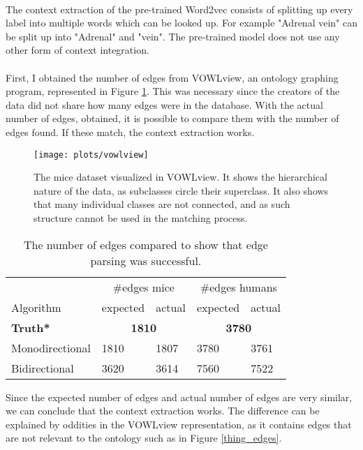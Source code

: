 \documentclass{article}
\begin{document}
  \paragraph{}
  The context extraction of the pre-trained Word2vec consists of splitting up every label into multiple words which can be looked up. For example "Adrenal vein" can be split up into "Adrenal" and "vein".
  The pre-trained model does not use any other form of context integration.
  \paragraph{}
  First, I obtained the number of edges from VOWLview\cite{vowlview}, an ontology graphing program, represented in Figure \ref{vowlfig}. This was necessary since the creators of the data did not share how many edges were in the database. With the actual number of edges, obtained, it is possible to compare them with the number of edges found. If these match, the context extraction works.
  
  \begin{figure}[H]
  \centering
  \texttt{[image: plots/vowlview]}
  \caption[VOWLview of mice dataset]{The mice dataset visualized in VOWLview. It shows the hierarchical nature of the data, as subclasses circle their superclass. It also shows that many individual classes are not connected, and as such structure cannot be used in the matching process.}
  \label{vowlfig}
  \end{figure}
  
  \begin{table}[H]
  \centering
  \caption[Edge comparison]{The number of edges compared to show that edge parsing was successful.}
  \label{edgecounts}
  \begin{tabular}{l|ll|ll}  
  & \multicolumn{2}{c}{\#edges mice} & \multicolumn{2}{c|}{\#edges humans}\\
  Algorithm & expected & actual & expected & actual\\
  \hline
  \textbf{Truth*} & \multicolumn{2}{c|}{\textbf{1810}} & \multicolumn{2}{c}{\textbf{3780}} \\
  Monodirectional & 1810 & 1807 & 3780 & 3761\\
  Bidirectional & 3620 & 3614 & 7560 & 7522\\
  \end{tabular}
  \end{table}

  Since the expected number of edges and actual number of edges are very similar, we can conclude that the context extraction works. The difference can be explained by oddities in the VOWLview representation, as it contains edges that are not relevant to the ontology such as in Figure \ref{thing_edges}.
  
\end{document}
